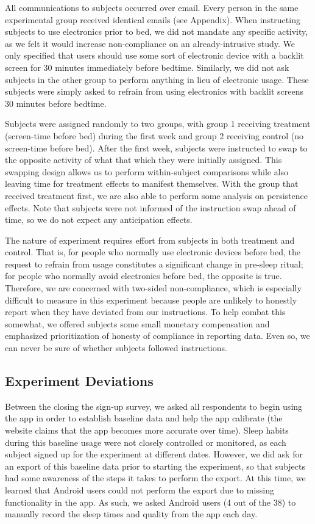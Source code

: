 \documentclass[12pt,]{article}
\begin{document}
All communications to subjects occurred over email. Every person in the
same experimental group received identical emails (see Appendix). When
instructing subjects to use electronics prior to bed, we did not mandate
any specific activity, as we felt it would increase non-compliance on an
already-intrusive study. We only specified that users should use some
sort of electronic device with a backlit screen for 30 minutes
immediately before bedtime. Similarly, we did not ask subjects in the
other group to perform anything in lieu of electronic usage. These
subjects were simply asked to refrain from using electronics with
backlit screens 30 minutes before bedtime.

Subjects were assigned randomly to two groups, with group 1 receiving
treatment (screen-time before bed) during the first week and group 2
receiving control (no screen-time before bed). After the first week,
subjects were instructed to swap to the opposite activity of what that
which they were initially assigned. This swapping design allows us to
perform within-subject comparisons while also leaving time for treatment
effects to manifest themselves. With the group that received treatment
first, we are also able to perform some analysis on persistence effects.
Note that subjects were not informed of the instruction swap ahead of
time, so we do not expect any anticipation effects.

The nature of experiment requires effort from subjects in both treatment
and control. That is, for people who normally use electronic devices
before bed, the request to refrain from usage constitutes a significant
change in pre-sleep ritual; for people who normally avoid electronics
before bed, the opposite is true. Therefore, we are concerned with
two-sided non-compliance, which is especially difficult to measure in
this experiment because people are unlikely to honestly report when they
have deviated from our instructions. To help combat this somewhat, we
offered subjects some small monetary compensation and emphasized
prioritization of honesty of compliance in reporting data. Even so, we
can never be sure of whether subjects followed instructions.

\subsection{Experiment Deviations}\label{experiment-deviations}

Between the closing the sign-up survey, we asked all respondents to
begin using the app in order to establish baseline data and help the app
calibrate (the website claims that the app becomes more accurate over
time). Sleep habits during this baseline usage were not closely
controlled or monitored, as each subject signed up for the experiment at
different dates. However, we did ask for an export of this baseline data
prior to starting the experiment, so that subjects had some awareness of
the steps it takes to perform the export. At this time, we learned that
Android users could not perform the export due to missing functionality
in the app. As such, we asked Android users (4 out of the 38) to
manually record the sleep times and quality from the app each day.
\end{document}
